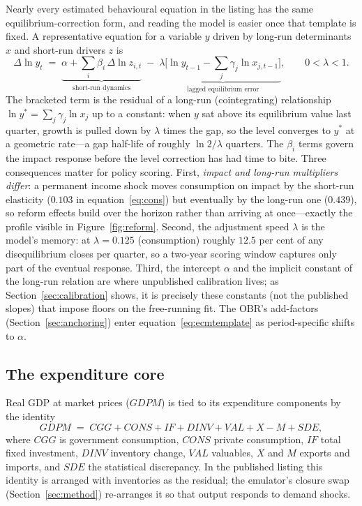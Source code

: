 Nearly every estimated behavioural equation in the listing has the same equilibrium-correction form, and reading the model is easier once that template is fixed. A representative equation for a variable $y$ driven by long-run determinants $x$ and short-run drivers $z$ is
\begin{equation}
\Delta \ln y_t \;=\; \underbrace{\alpha + \textstyle\sum_i \beta_i\, \Delta \ln z_{i,t}}_{\text{short-run dynamics}} \;-\; \lambda \underbrace{\big[\ln y_{t-1} - \textstyle\sum_j \gamma_j \ln x_{j,t-1}\big]}_{\text{lagged equilibrium error}},
\qquad 0 < \lambda < 1 .
\label{eq:ecmtemplate}
\end{equation}
The bracketed term is the residual of a long-run (cointegrating) relationship $\ln y^* = \sum_j \gamma_j \ln x_j$ up to a constant: when $y$ sat above its equilibrium value last quarter, growth is pulled down by $\lambda$ times the gap, so the level converges to $y^*$ at a geometric rate---a gap half-life of roughly $\ln 2/\lambda$ quarters. The $\beta_i$ terms govern the impact response before the level correction has had time to bite. Three consequences matter for policy scoring. First, \emph{impact and long-run multipliers differ}: a permanent income shock moves consumption on impact by the short-run elasticity ($0.103$ in equation~\eqref{eq:cons}) but eventually by the long-run one ($0.439$), so reform effects build over the horizon rather than arriving at once---exactly the profile visible in Figure~\ref{fig:reform}. Second, the adjustment speed $\lambda$ is the model's memory: at $\lambda = 0.125$ (consumption) roughly $12.5$ per cent of any disequilibrium closes per quarter, so a two-year scoring window captures only part of the eventual response. Third, the intercept $\alpha$ and the implicit constant of the long-run relation are where unpublished calibration lives; as Section~\ref{sec:calibration} shows, it is precisely these constants (not the published slopes) that impose floors on the free-running fit. The OBR's add-factors (Section~\ref{sec:anchoring}) enter equation~\eqref{eq:ecmtemplate} as period-specific shifts to $\alpha$.

\subsection{The expenditure core}

Real GDP at market prices ($GDPM$) is tied to its expenditure components by the identity
\begin{equation}
GDPM \;=\; CGG + CONS + IF + DINV + VAL + X - M + SDE,
\label{eq:gdpid}
\end{equation}
where $CGG$ is government consumption, $CONS$ private consumption, $IF$ total fixed investment, $DINV$ inventory change, $VAL$ valuables, $X$ and $M$ exports and imports, and $SDE$ the statistical discrepancy. In the published listing this identity is arranged with inventories as the residual; the emulator's closure swap (Section~\ref{sec:method}) re-arranges it so that output responds to demand shocks.

